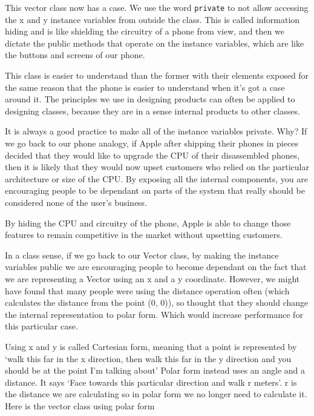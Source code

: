 \documentclass{article}
\begin{document}
  This vector class now has a case. We use the word \texttt{private} to not allow accessing
  the x and y instance variables from outside the class. This is called information
  hiding and is like shielding the circuitry of a phone from view, and then we
  dictate the public methods that operate on the instance variables, which are
  like the buttons and screens of our phone.

  This class is easier to understand than the former with their elements exposed
  for the same reason that the phone is easier to understand when it's got a case
  around it. The principles we use in designing products can often be applied
  to designing classes, because they are in a sense internal products to other
  classes.
  
  It is always a good practice to make all of the instance variables private.
  Why? If we go back to our phone analogy, if Apple after shipping their phones
  in pieces decided that they would like to upgrade the CPU of their disassembled
  phones, then it is likely that they would now upset customers who relied on
  the particular architecture or size of the CPU. By exposing all the internal
  components, you are encouraging people to be dependant on parts of the system
  that really should be considered none of the user's business.

  By hiding the CPU and circuitry of the phone, Apple is able to change those
  features to remain competitive in the market without upsetting customers.

  In a class sense, if we go back to our Vector class, by making the instance
  variables public we are encouraging people to become dependant on the fact
  that we are representing a Vector using an x and a y coordinate. However,
  we might have found that many people were using the distance operation often
  (which calculates the distance from the point (0, 0)), so thought that they
  should change the internal representation to polar form. Which would increase
  performance for this particular case.
  
  Using x and y is
  called Cartesian form, meaning that a point is represented by `walk this far
  in the x direction, then walk this far in the y direction and you should 
  be at the point I'm talking about' Polar form instead uses an angle and a distance.
  It says `Face towards this particular direction and walk r meters'. r is the
  distance we are calculating so in polar form we no longer need to calculate
  it. Here is the vector class using polar form
\end{document}

